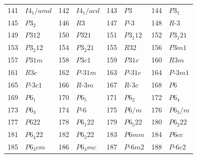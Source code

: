 \documentclass[12pt]{article}
\begin{document}
\begin{center}
{\begin{tabular}{|r|l||r|l||r|l||r|l|}
 141 & $I4_{1}/amd$                           & 142 & $I4_{1}/acd$                           & 143 & $P3$                                   & 144 & $P3_{1}$                               \\
 145 & $P3_{2}$                               & 146 & $R3$                                   & 147 & $P\mbox{-}3$                           & 148 & $R\mbox{-}3$                           \\
 149 & $P312$                                 & 150 & $P321$                                 & 151 & $P3_{1}12$                             & 152 & $P3_{1}21$                             \\
 153 & $P3_{2}12$                             & 154 & $P3_{2}21$                             & 155 & $R32$                                  & 156 & $P3m1$                                 \\
 157 & $P31m$                                 & 158 & $P3c1$                                 & 159 & $P31c$                                 & 160 & $R3m$                                  \\
 161 & $R3c$                                  & 162 & $P\mbox{-}31m$                         & 163 & $P\mbox{-}31c$                         & 164 & $P\mbox{-}3m1$                         \\
 165 & $P\mbox{-}3c1$                         & 166 & $R\mbox{-}3m$                          & 167 & $R\mbox{-}3c$                          & 168 & $P6$                                   \\
 169 & $P6_{1}$                               & 170 & $P6_{5}$                               & 171 & $P6_{2}$                               & 172 & $P6_{4}$                               \\
 173 & $P6_{3}$                               & 174 & $P\mbox{-}6$                           & 175 & $P6/m$                                 & 176 & $P6_{3}/m$                             \\
 177 & $P622$                                 & 178 & $P6_{1}22$                             & 179 & $P6_{5}22$                             & 180 & $P6_{2}22$                             \\
 181 & $P6_{4}22$                             & 182 & $P6_{3}22$                             & 183 & $P6mm$                                 & 184 & $P6cc$                                 \\
 185 & $P6_{3}cm$                             & 186 & $P6_{3}mc$                             & 187 & $P\mbox{-}6m2$                         & 188 & $P\mbox{-}6c2$                         \\

\end{tabular}}
\end{center}
\end{document}
